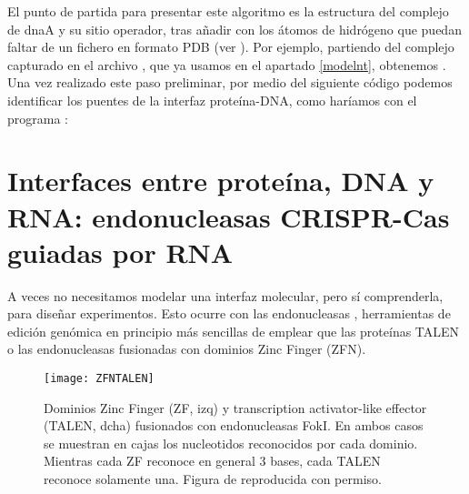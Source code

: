 El punto de partida para presentar este algoritmo es la estructura del complejo de dnaA y su sitio operador, tras a\~nadir con
 los \'{a}tomos de hidr\'{o}geno que puedan faltar de un fichero
en formato PDB (ver ).
Por ejemplo, partiendo del complejo capturado en el archivo , 
que ya usamos en el apartado \ref{modelnt}, obtenemos . 
Una vez realizado este paso preliminar,
por medio del siguiente c\'{o}digo podemos identificar los puentes de la interfaz prote\'{i}na-DNA, como har\'{i}amos con el programa
 \citep{McDonald1994}:



\section{Interfaces entre prote\'{i}na, DNA y RNA: endonucleasas CRISPR-Cas guiadas por RNA} \label{CRISPR}

A veces no necesitamos modelar una interfaz molecular, pero s\'{i} comprenderla, para dise\~{n}ar experimentos.
Esto ocurre con las endonucleasas , 
herramientas de edici\'{o}n gen\'{o}mica en principio 
m\'{a}s sencillas de emplear que las prote\'{i}nas TALEN o las endonucleasas fusionadas con dominios Zinc Finger (ZFN).

\begin{figure}
\begin{center} 
\texttt{[image: ZFNTALEN]}
\caption%
{
Dominios Zinc Finger (ZF, izq) y transcription activator-like effector (TALEN, dcha) fusionados con endonucleasas FokI.
En ambos casos se muestran en cajas los nucleotidos reconocidos por cada dominio. 
Mientras cada ZF reconoce en general 3 bases, cada TALEN reconoce solamente una.
Figura de \cite{Gaj2013} reproducida con permiso.
}
\label{fig:ZFNTALEN}
\end{center}
\end{figure}

